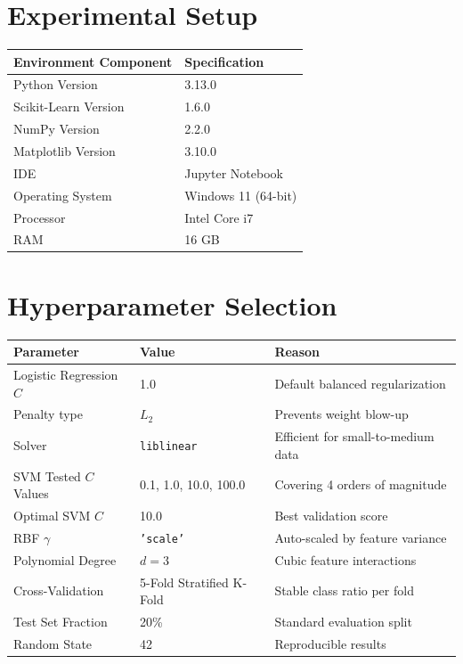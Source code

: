 \documentclass[12pt,a4paper]{article}
\begin{document}
\section{Experimental Setup}

\begin{tabular}{ll}
\toprule
\textbf{Environment Component} & \textbf{Specification} \\
\midrule
Python Version & 3.13.0 \\
Scikit-Learn Version & 1.6.0 \\
NumPy Version & 2.2.0 \\
Matplotlib Version & 3.10.0 \\
IDE & Jupyter Notebook \\
Operating System & Windows 11 (64-bit) \\
Processor & Intel Core i7 \\
RAM & 16 GB \\
\bottomrule
\end{tabular}

\section{Hyperparameter Selection}

\begin{tabular}{lll}
\toprule
\textbf{Parameter} & \textbf{Value} & \textbf{Reason} \\
\midrule
Logistic Regression $C$ & 1.0 & Default balanced regularization \\
Penalty type & $L_2$ & Prevents weight blow-up \\
Solver & \texttt{liblinear} & Efficient for small-to-medium data \\
SVM Tested $C$ Values & 0.1, 1.0, 10.0, 100.0 & Covering 4 orders of magnitude \\
Optimal SVM $C$ & 10.0 & Best validation score \\
RBF $\gamma$ & \texttt{'scale'} & Auto-scaled by feature variance \\
Polynomial Degree & $d = 3$ & Cubic feature interactions \\
Cross-Validation & 5-Fold Stratified K-Fold & Stable class ratio per fold \\
Test Set Fraction & 20\% & Standard evaluation split \\
Random State & 42 & Reproducible results \\
\bottomrule
\end{tabular}
\end{document}
